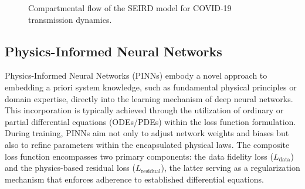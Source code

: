 \documentclass[12pt]{article}
\begin{document}
\begin{figure}[h!]
    \centering
    \caption{Compartmental flow of the SEIRD model for COVID-19 transmission dynamics.}
\end{figure}

\subsection{Physics-Informed Neural Networks}

Physics-Informed Neural Networks (PINNs) embody a novel approach to embedding a priori system knowledge, such as fundamental physical principles or domain expertise, directly into the learning mechanism of deep neural networks. This incorporation is typically achieved through the utilization of ordinary or partial differential equations (ODEs/PDEs) within the loss function formulation. During training, PINNs aim not only to adjust network weights and biases but also to refine parameters within the encapsulated physical laws. The composite loss function encompasses two primary components: the data fidelity loss ($L_{\text{data}}$) and the physics-based residual loss ($L_{\text{residual}}$), the latter serving as a regularization mechanism that enforces adherence to established differential equations.
\end{document}
